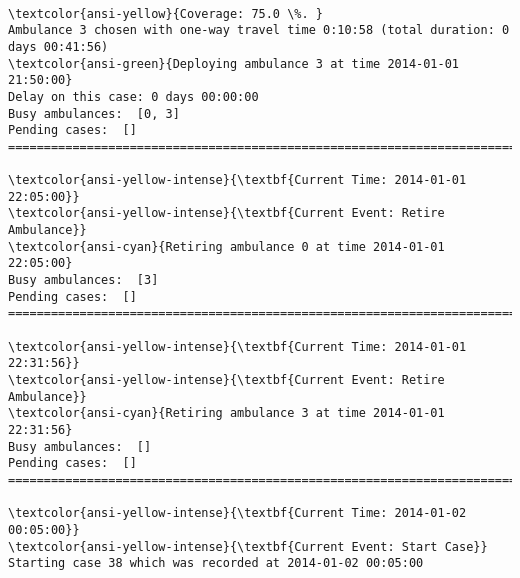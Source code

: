 \documentclass[11pt]{article}
\begin{document}
    \begin{center}
    \end{center}
    { \hspace*{\fill} \\}
    
    \begin{Verbatim}[commandchars=\\\{\}]
\textcolor{ansi-yellow}{Coverage: 75.0 \%. }
Ambulance 3 chosen with one-way travel time 0:10:58 (total duration: 0 days 00:41:56)
\textcolor{ansi-green}{Deploying ambulance 3 at time 2014-01-01 21:50:00}
Delay on this case: 0 days 00:00:00
Busy ambulances:  [0, 3]
Pending cases:  []
========================================================================

\textcolor{ansi-yellow-intense}{\textbf{Current Time: 2014-01-01 22:05:00}}
\textcolor{ansi-yellow-intense}{\textbf{Current Event: Retire Ambulance}}
\textcolor{ansi-cyan}{Retiring ambulance 0 at time 2014-01-01 22:05:00}
Busy ambulances:  [3]
Pending cases:  []
========================================================================

\textcolor{ansi-yellow-intense}{\textbf{Current Time: 2014-01-01 22:31:56}}
\textcolor{ansi-yellow-intense}{\textbf{Current Event: Retire Ambulance}}
\textcolor{ansi-cyan}{Retiring ambulance 3 at time 2014-01-01 22:31:56}
Busy ambulances:  []
Pending cases:  []
========================================================================

\textcolor{ansi-yellow-intense}{\textbf{Current Time: 2014-01-02 00:05:00}}
\textcolor{ansi-yellow-intense}{\textbf{Current Event: Start Case}}
Starting case 38 which was recorded at 2014-01-02 00:05:00

    \end{Verbatim}

    \begin{center}
    \end{center}
    { \hspace*{\fill} \\}
    
\end{document}
